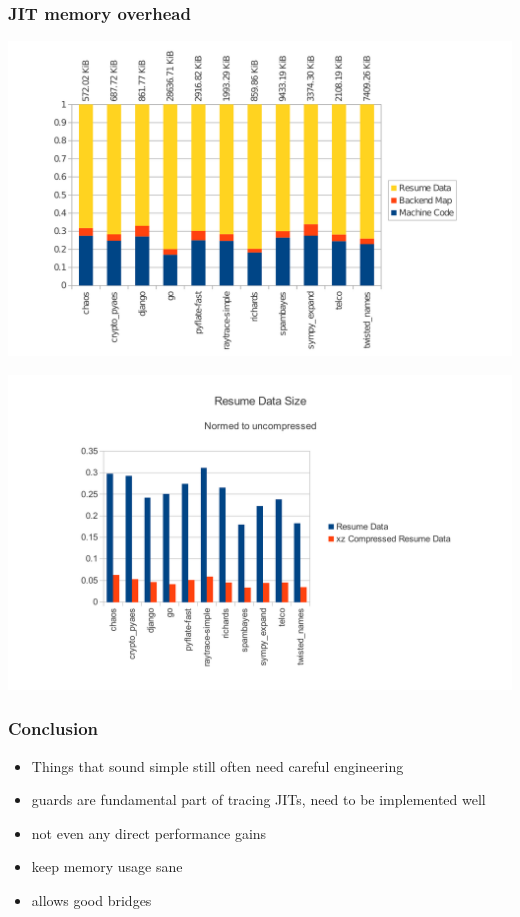 \documentclass[utf8x]{beamer}
\begin{document}
\begin{frame}
  \frametitle{JIT memory overhead}
  \includegraphics[width=\textwidth]{figures/jit_memory}
\end{frame}

\begin{frame}
  \includegraphics[scale=0.6]{figures/resume_data_size}
\end{frame}

\begin{frame}
  \frametitle{Conclusion}
  \begin{itemize}
      \item Things that sound simple still often need careful engineering
      \pause
      \item guards are fundamental part of tracing JITs, need to be implemented well
      \item not even any direct performance gains
      \item keep memory usage sane
      \item allows good bridges
  \end{itemize}
\end{frame}
\end{document}
